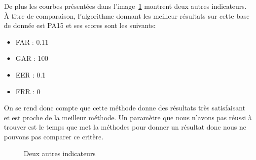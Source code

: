 \documentclass{report}
\begin{document}
De plus les courbes présentées dans l'image~\ref{fig:res} montrent
deux autres indicateurs. À titre de comparaison, l'algorithme donnant
les meilleur résultats sur cette base de donnée est PA15 et ses scores
sont les suivants:

\begin{itemize}
\item FAR : 0.11%
\item GAR : 100%
\item EER : 0.1%
\item FRR : 0%
\end{itemize}

On se rend donc compte que cette méthode donne des résultats très
satisfaisant et est proche de la meilleur méthode. Un paramètre que
nous n'avons pas réussi à trouver est le temps que met la méthodes
pour donner un résultat donc nous ne pouvons pas comparer ce critère.

\begin{figure}
  \centering{}
  \centering{}
  \caption{Deux autres indicateurs}
  \label{fig:res}
\end{figure}
\end{document}
